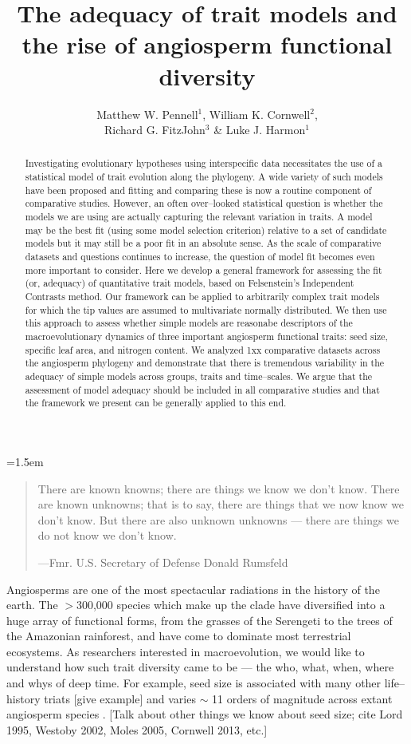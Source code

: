 \documentclass[12pt]{article}
\title{The adequacy of trait models and the rise of angiosperm functional diversity}
\author{
Matthew W. Pennell$^{1}$, William K. Cornwell$^{2}$,\\
Richard G. FitzJohn$^{3}$ \& Luke J. Harmon$^{1}$
}
\date{}
\affiliation{
\begin{center}
\textit{
$^{1}$ Department of Biological Sciences \& Institute for Bioinformatics and Evolutionary Studies, University of Idaho, Moscow, ID 83844, U.S.A.\\[0.5cm]
$^{2}$ School of BEES, University of New South Wales, Sydney, NSW 2052, Australia\\[0.5cm]
$^{3}$ Department of Biological Sciences, Macquarie University, Sydney, NSW 2109, Australia\\[0.5cm]
Email for correspondence: mwpennell@gmail.com}
\end{center}
}
\begin{document}
\mstitlepage
\parindent=1.5em
\addtolength{\parskip}{.3em}

\begin{abstract}
Investigating evolutionary hypotheses using interspecific data necessitates the use of a statistical model of trait evolution along the phylogeny. A wide variety of such models have been proposed and fitting and comparing these is now a routine component of comparative studies. However, an often over--looked statistical question is whether the models we are using are actually capturing the relevant variation in traits. A model may be the best fit (using some model selection criterion) relative to a set of candidate models but it may still be a poor fit in an absolute sense. As the scale of comparative datasets and questions continues to increase, the question of model fit becomes even more important to consider. Here we develop a general framework for assessing the fit (or, adequacy) of quantitative trait models, based on Felsenstein's Independent Contrasts method. Our framework can be applied to arbitrarily complex trait models for which the tip values are assumed to multivariate normally distributed. We then use this approach to assess whether simple models are reasonabe descriptors of the macroevolutionary dynamics of three important angiosperm functional traits: seed size, specific leaf area, and nitrogen content. We analyzed 1xx comparative datasets across the angiosperm phylogeny and demonstrate that there is tremendous variability in the adequacy of simple models across groups, traits and time--scales. We argue that the assessment of model adequacy should be included in all comparative studies and that the framework we present can be generally applied to this end.  
\end{abstract}

\vfill

\newpage


\begin{quotation}
\noindent There are known knowns; there are things we know we don't know. There are known unknowns; that is to say, there are things that we now know we don't know. But there are also unknown unknowns --- there are things we do not know we don't know. 

---Fmr. U.S. Secretary of Defense Donald Rumsfeld
\end{quotation}


\noident Angiosperms are one of the most spectacular radiations in the history of the earth. The $>$300,000 species which make up the clade have diversified into a huge array of functional forms, from the grasses of the Serengeti to the trees of the Amazonian rainforest, and have come to dominate most terrestrial ecosystems. As researchers interested in macroevolution, we would like to understand how such trait diversity came to be --- the who, what, when, where and whys of deep time. For example, seed size is associated with many other life--history triats [give example] and varies $\sim$ 11 orders of magnitude across extant angiosperm species \citep{Westoby1992TREE, Moles2005}. [Talk about other things we know about seed size; cite Lord 1995, Westoby 2002, Moles 2005, Cornwell 2013, etc.]
\end{document}
